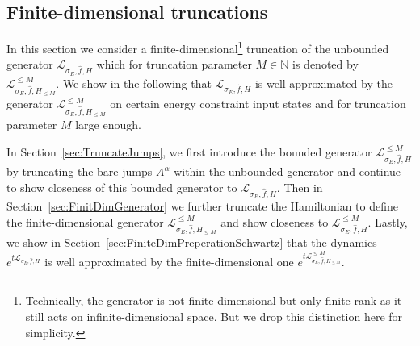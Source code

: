 \documentclass[11pt]{amsart}
\newcommand{\1}{\mathbbm{1}}
\newcommand{\N}{\mathbb{N}}
\newcommand{\E}{\mathbb{E}}
\newcommand{\spec}{\operatorname{Sp}}
\theoremstyle{plain}
\theoremstyle{definition}
\theoremstyle{remark}
\numberwithin{equation}{section}
\begin{document}

\subsection{Finite-dimensional truncations}
\label{sec:FiniteTruncBareJumps}
In this section we consider a finite-dimensional\footnote{Technically, the generator  is not finite-dimensional but only finite rank as it still acts on infinite-dimensional space. But we drop this distinction here for simplicity.} truncation of the unbounded generator $\mathcal{L}_{\sigma_E,\widehat{f},H}$ which for truncation parameter $M\in\N$ is denoted by $\mathcal{L}^{\le M}_{\sigma_E,\widehat{f},H_{\le M}}.$
We show in the following that $\mathcal{L}_{\sigma_E,\widehat{f},H}$ is well-approximated by the generator $\mathcal{L}^{\le M}_{\sigma_E,\widehat{f},H_{\le M}}$
 on certain energy constraint input states and for truncation parameter $M$ large enough. 

 In Section~\ref{sec:TruncateJumps}, we first introduce the bounded generator $\mathcal{L}^{\le M}_{\sigma_E,\widehat{f},H}$ by truncating the bare jumps $A^\alpha$ within the unbounded generator and continue to show closeness of this bounded generator to $\mathcal{L}_{\sigma_E,\widehat{f},H}.$ Then in Section~\ref{sec:FinitDimGenerator} we further truncate the Hamiltonian to define the finite-dimensional generator $\mathcal{L}^{\le M}_{\sigma_E,\widehat{f},H_{\le M}}$ and show closeness to $\mathcal{L}^{\le M}_{\sigma_E,\widehat{f},H}.$ Lastly, we show in Section~\ref{sec:FiniteDimPreperationSchwartz} that the dynamics $e^{t\mathcal{L}_{\sigma_E,\widehat{f},H}}$ is well approximated by the finite-dimensional one $e^{t\mathcal{L}^{\le M}_{\sigma_E,\widehat{f},H_{\le M}}}.$
\end{document}
